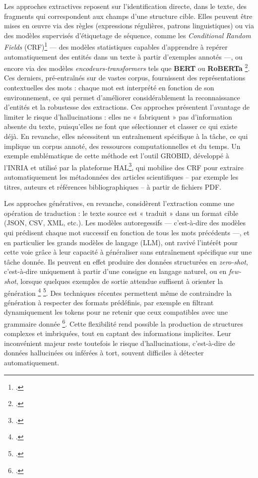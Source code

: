 Les approches extractives reposent sur l’identification directe, dans le texte, des fragments qui correspondent aux champs d’une structure cible. Elles peuvent être mises en œuvre via des règles (expressions régulières, patrons linguistiques) ou via des modèles supervisés d’étiquetage de séquence, comme les \emph{Conditional Random Fields} (CRF)\footcite[][]{finkel} — des modèles statistiques capables d’apprendre à repérer automatiquement des entités dans un texte à partir d’exemples annotés —, ou encore via des modèles \emph{encodeurs-transformers} tels que \textbf{BERT} ou \textbf{RoBERTa} \footcite[][]{devlin}. Ces derniers, pré-entraînés sur de vastes corpus, fournissent des représentations contextuelles des mots : chaque mot est interprété en fonction de son environnement, ce qui permet d’améliorer considérablement la reconnaissance d’entités et la robustesse des extractions. Ces approches présentent l’avantage de limiter le risque d’hallucinations : elles ne « fabriquent » pas d’information absente du texte, puisqu’elles ne font que sélectionner et classer ce qui existe déjà. En revanche, elles nécessitent un entraînement spécifique à la tâche, ce qui implique un corpus annoté, des ressources computationnelles et du temps. Un exemple emblématique de cette méthode est l’outil GROBID, développé à l’INRIA et utilisé par la plateforme HAL\footcite[][]{grobid}, qui mobilise des CRF pour extraire automatiquement les métadonnées des articles scientifiques -- par exemple les titres, auteurs et références bibliographiques -- à partir de fichiers PDF.

Les approches génératives, en revanche, considèrent l’extraction comme une opération de traduction : le texte source est « traduit » dans un format cible (JSON, CSV, XML, etc.). Les modèles autoregessifs — c’est-à-dire des modèles qui prédisent chaque mot successif en fonction de tous les mots précédents —, et en particulier les grands modèles de langage (LLM), ont ravivé l’intérêt pour cette voie grâce à leur capacité à généraliser sans entraînement spécifique sur une tâche donnée. Ils peuvent en effet produire des données structurées en \emph{zero-shot}, c’est-à-dire uniquement à partir d’une consigne en langage naturel, ou en \emph{few-shot}, lorsque quelques exemples de sortie attendue suffisent à orienter la génération \footcite[][]{brown} \footcite[][]{radford}. Des techniques récentes permettent même de contraindre la génération à respecter des formats prédéfinis, par exemple en filtrant dynamiquement les tokens pour ne retenir que ceux compatibles avec une grammaire donnée \footcite[][]{wei}. Cette flexibilité rend possible la production de structures complexes et imbriquées, tout en captant des informations implicites. Leur inconvénient majeur reste toutefois le risque d’hallucinations, c’est-à-dire de données hallucinées ou inférées à tort, souvent difficiles à détecter automatiquement.

